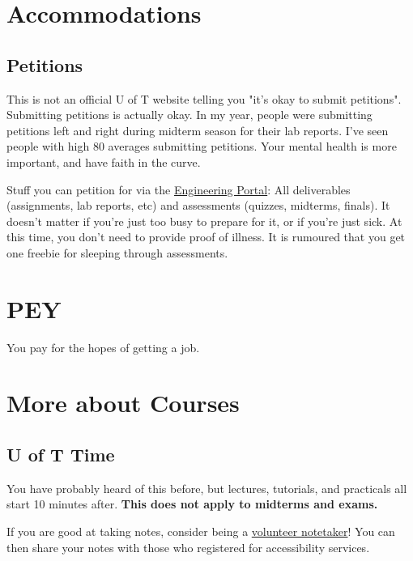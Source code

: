 \section{Accommodations}

\subsection{Petitions}

This is not an official U of T website telling you "it's okay to submit petitions". Submitting petitions is actually okay. In my year, people were submitting petitions left and right during midterm season for their lab reports. I've seen people with high 80 averages submitting petitions. Your mental health is more important, and have faith in the curve.

Stuff you can petition for via the \href{https://www.google.com/url?sa=t&rct=j&q=&esrc=s&source=web&cd=&cad=rja&uact=8&ved=2ahUKEwjZj-qeh-7-AhX-kokEHX8-C8YQFnoECA0QAQ&url=http\%3A\%2F\%2Fundergrad.engineering.utoronto.ca\%2Fskule-\%2520\%2520\%2520\%2520\%2520\%2520\%2520\%2520\%2520\%2520\%2520\%2520life\%2Fthe-engineering-portal\%2F&usg=AOvVaw145xL8tAHUKBRq6D6rbDhS}{Engineering Portal}: All deliverables (assignments, lab reports, etc) and assessments (quizzes, midterms, finals). It doesn't matter if you're just too busy to prepare for it, or if you're just sick. At this time, you don't need to provide proof of illness. It is rumoured that you get one freebie for sleeping through assessments.

\section{PEY}

You pay for the hopes of getting a job.

\section{More about Courses}

\subsection{U of T Time}

You have probably heard of this before, but lectures, tutorials, and practicals all start 10 minutes after. \textbf{This does not apply to midterms and exams.}


If you are good at taking notes, consider being a \href{https://studentlife.utoronto.ca/program/volunteer-note-taking/}{volunteer notetaker}! You can then share your notes with those who registered for accessibility services.

